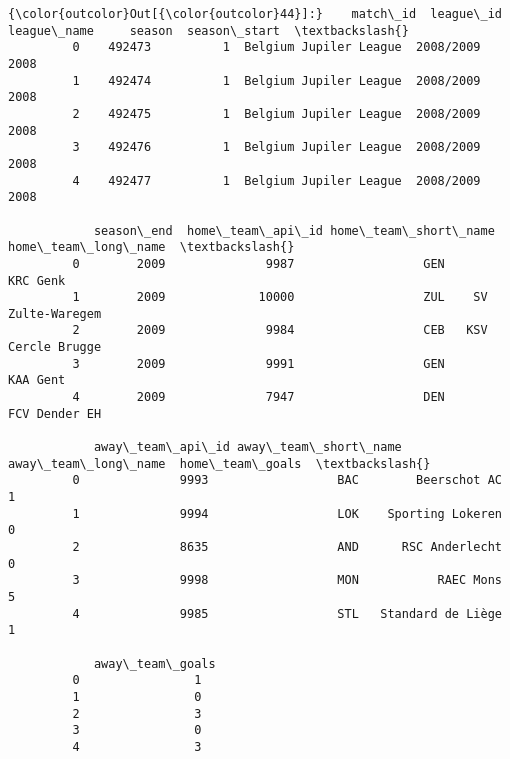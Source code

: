 \documentclass[11pt]{article}
\begin{document}
\begin{Verbatim}[commandchars=\\\{\}]
{\color{outcolor}Out[{\color{outcolor}44}]:}    match\_id  league\_id             league\_name     season  season\_start  \textbackslash{}
         0    492473          1  Belgium Jupiler League  2008/2009          2008   
         1    492474          1  Belgium Jupiler League  2008/2009          2008   
         2    492475          1  Belgium Jupiler League  2008/2009          2008   
         3    492476          1  Belgium Jupiler League  2008/2009          2008   
         4    492477          1  Belgium Jupiler League  2008/2009          2008   
         
            season\_end  home\_team\_api\_id home\_team\_short\_name home\_team\_long\_name  \textbackslash{}
         0        2009              9987                  GEN            KRC Genk   
         1        2009             10000                  ZUL    SV Zulte-Waregem   
         2        2009              9984                  CEB   KSV Cercle Brugge   
         3        2009              9991                  GEN            KAA Gent   
         4        2009              7947                  DEN       FCV Dender EH   
         
            away\_team\_api\_id away\_team\_short\_name away\_team\_long\_name  home\_team\_goals  \textbackslash{}
         0              9993                  BAC        Beerschot AC                1   
         1              9994                  LOK    Sporting Lokeren                0   
         2              8635                  AND      RSC Anderlecht                0   
         3              9998                  MON           RAEC Mons                5   
         4              9985                  STL   Standard de Liège                1   
         
            away\_team\_goals  
         0                1  
         1                0  
         2                3  
         3                0  
         4                3  
\end{Verbatim}
            
\end{document}
